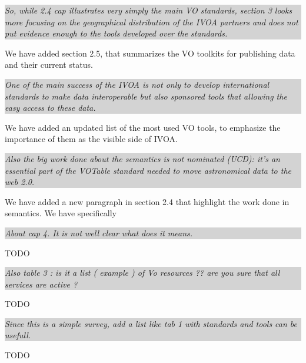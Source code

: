 \documentclass[a4paper]{article}
\newcommand{\quoting}[1]{
  
  
  \colorbox{lightgray}{
    \begin{minipage}{0.98\linewidth}
      \em #1
    \end{minipage}
  }
  
  
}
\begin{document}
\quoting{
So, while 2.4 cap illustrates very simply the main VO standards, section 3 looks
more focusing on the geographical distribution of the IVOA partners and does not
put evidence enough to the tools developed over the standards.
}

We have added section 2.5, that summarizes the VO toolkits for publishing data
and their current status.

\quoting{
One of the main
success of the IVOA is not only to develop international standards to make data
interoperable but also sponsored tools that allowing the easy access to these
data.
}

We have added an updated list of the most used VO tools, to emphasize the 
importance of them as the visible side of IVOA. 

\quoting{
Also the big work done about the semantics is not nominated (UCD): it's an
essential part of the VOTable standard needed to move astronomical data to the
web 2.0.
}

We have added a new paragraph in section 2.4 that highlight the work done in
semantics. We have specifically 

\quoting{
About cap 4. It is not well clear what does it means. 
}

TODO

\quoting{
Also table 3 : is it a list ( example ) of Vo resources ??  are you sure that
all services are active ?
}

TODO

\quoting{
Since this is a simple survey, add a list like tab 1 with standards and tools
can be usefull.
}

TODO

\cite{Borne2013,HanischQuinn2003}



\end{document}
